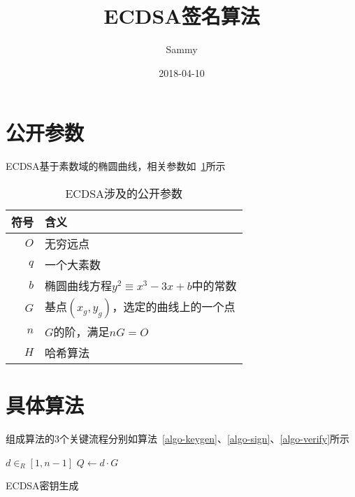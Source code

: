 \documentclass[a4paper,10pt]{article}
\title{ECDSA签名算法}
\author{Sammy}
\date{2018-04-10}
\begin{document}
\maketitle

\section{公开参数}
ECDSA基于素数域的椭圆曲线，相关参数如\tablename~\ref{tab-param}所示  
\begin{table}[!htbp]
  \centering
  \caption{ECDSA涉及的公开参数}\label{tab-param}
  \begin{tabular}{rl}
    \hline
    符号 &含义 \\
    \hline
    \(O\) &无穷远点 \\
    \(q\) &一个大素数 \\ 
    \(b\) &椭圆曲线方程\(y^2\equiv x^3-3x+b\)中的常数 \\
    \(G\) &基点\((x_g,y_g)\)，选定的曲线上的一个点 \\
    \(n\) &\(G\)的阶，满足\(nG=O\) \\
    \(H\) &哈希算法 \\
    \hline
  \end{tabular}
\end{table}

\section{具体算法}
组成算法的3个关键流程分别如算法~\ref{algo-keygen}、\ref{algo-sign}、\ref{algo-verify}所示

\begin{algorithm}
  \DontPrintSemicolon

  \BlankLine

  \(d\in_R [1,n-1]\) 
  \(Q\leftarrow d\cdot G\)\;
  \caption{ECDSA密钥生成}\label{algo-keygen}
\end{algorithm}
\end{document}
